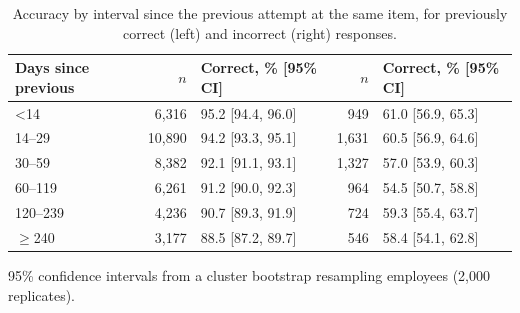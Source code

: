\begin{table}[htbp]
\centering
\caption{Accuracy by interval since the previous attempt at the same item, for previously correct (left) and incorrect (right) responses.}
\label{tab:retention_interval}
\small
\begin{tabular}{lrlrl}
\toprule
Days since previous & $n$ & Correct, \% [95\% CI] & $n$ & Correct, \% [95\% CI] \\
\midrule
<14 & 6,316 & 95.2 [94.4, 96.0] & 949 & 61.0 [56.9, 65.3] \\
14--29 & 10,890 & 94.2 [93.3, 95.1] & 1,631 & 60.5 [56.9, 64.6] \\
30--59 & 8,382 & 92.1 [91.1, 93.1] & 1,327 & 57.0 [53.9, 60.3] \\
60--119 & 6,261 & 91.2 [90.0, 92.3] & 964 & 54.5 [50.7, 58.8] \\
120--239 & 4,236 & 90.7 [89.3, 91.9] & 724 & 59.3 [55.4, 63.7] \\
$\geq$240 & 3,177 & 88.5 [87.2, 89.7] & 546 & 58.4 [54.1, 62.8] \\
\bottomrule
\end{tabular}

\vspace{2pt}
\parbox{\linewidth}{\footnotesize 95\% confidence intervals from a cluster bootstrap resampling employees (2,000 replicates).}
\end{table}

